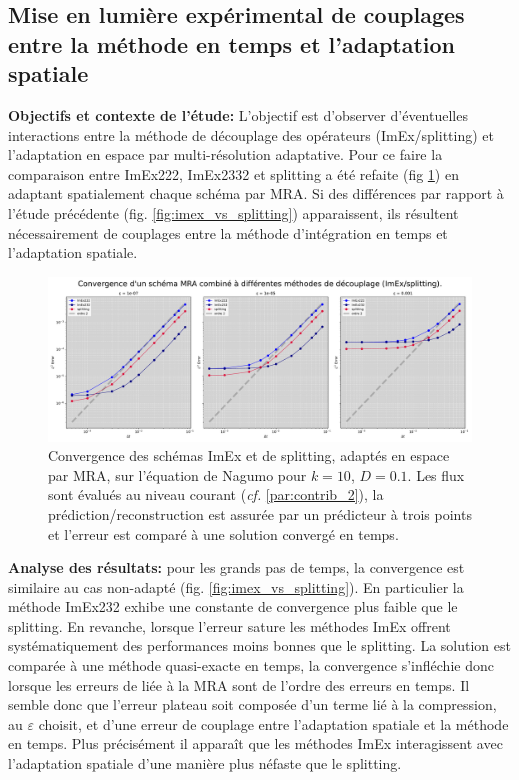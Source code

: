 \subsection{Mise en lumière expérimental de couplages entre la méthode en temps et l'adaptation spatiale}
\label{par:couplage_temps_adaptation}
\textbf{Objectifs et contexte de l'étude: }
L'objectif est d'observer d'éventuelles interactions entre la méthode de découplage des opérateurs (ImEx/splitting) et l'adaptation en espace par multi-résolution adaptative.
Pour ce faire la comparaison entre ImEx222, ImEx2332 et splitting a été refaite (fig \ref{fig:couplage-MRA-temps}) en adaptant spatialement chaque schéma par MRA.
Si des différences par rapport à l'étude précédente (fig. \ref{fig:imex_vs_splitting}) apparaissent, ils résultent nécessairement de couplages entre la méthode d'intégration en temps
et l'adaptation spatiale.\par
\begin{figure}[htbp!]
    \centering
    \includegraphics[width=\linewidth]{media/4_travail/2_nagumo/couplage/couplage_MRA_temps.pdf}
    \caption{Convergence des schémas ImEx et de splitting, adaptés en espace par MRA, sur l'équation de Nagumo pour $k=10$, $D=0.1$.
    Les flux sont évalués au niveau courant (\textit{cf.} \ref{par:contrib_2}), la prédiction/reconstruction est assurée par un prédicteur à trois points et l'erreur est comparé à une solution convergé en temps.}
    \label{fig:couplage-MRA-temps}
\end{figure}
\textbf{Analyse des résultats:} pour les grands pas de temps, la convergence est similaire au cas non-adapté (fig. \ref{fig:imex_vs_splitting}). En particulier la méthode
ImEx232 exhibe une constante de convergence plus faible que le splitting. 
En revanche, lorsque l'erreur sature les méthodes ImEx offrent systématiquement des performances moins bonnes que le splitting.
La solution est comparée à une méthode quasi-exacte en temps, la convergence s'infléchie donc lorsque les erreurs de liée à la MRA sont de l'ordre des erreurs en temps.
Il semble donc que l'erreur plateau soit composée d'un terme lié à la compression, au $\varepsilon$ choisit, et d'une erreur de couplage entre l'adaptation spatiale
et la méthode en temps. Plus précisément il apparaît que les méthodes ImEx interagissent avec l'adaptation spatiale d'une manière plus néfaste que le splitting.\\
